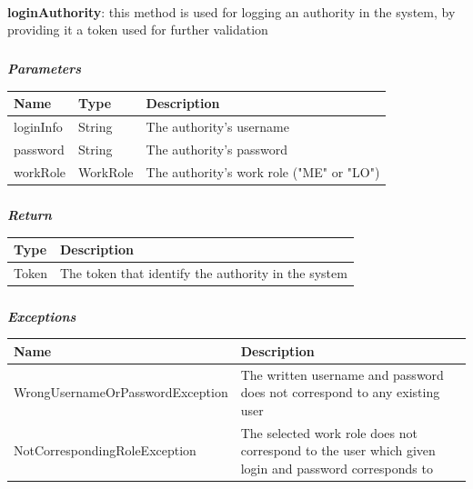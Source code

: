 					\paragraph{}
							\textbf{loginAuthority}: this method is used for logging an authority in the system, by providing it a token used for further validation
							\subparagraph{}
							\vspace{-3mm}
							\textcolor{myBlue}{\textit{\textbf{Parameters}}}
							\vspace{-2mm}
								\begin{table}[!h]
									\begin{tabular}{L{0.15\textwidth}L{0.15\textwidth}L{0.53\textwidth}}
										\toprule
										\textbf{Name} & \textbf{Type} & \textbf{Description} \\
										\midrule
								  		loginInfo & String & The authority's username \\
								  		password & String & The authority's password \\
								  		workRole & WorkRole & The authority's work role ("ME" or "LO") \\
								 		\bottomrule
									\end{tabular}
								\end{table}
							\subparagraph{}
							\vspace{-6mm}
								\textcolor{myGreen}{\textit{\textbf{Return}}}
								\vspace{-2mm}
									\begin{table}[!h]
									\begin{tabular}{L{0.15\textwidth}L{0.77\textwidth}}
										\toprule
										\textbf{Type} & \textbf{Description} \\
										\midrule
								  		Token & The token that identify the authority in the system \\
								 		\bottomrule
									\end{tabular}
								\end{table}
							\subparagraph{}
							\vspace{-6mm}
								\textcolor{myRed}{\textit{\textbf{Exceptions}}}
								\vspace{-2mm}
									\begin{table}[!h]
									\begin{tabular}{L{0.5\textwidth}L{0.42\textwidth}}
										\toprule
										\textbf{Name} & \textbf{Description} \\
										\midrule
								  	WrongUsernameOrPasswordException & The written username and password does not correspond to any existing user \\
								  	NotCorrespondingRoleException & The selected work role does not correspond to the user which given login and password corresponds to \\
								 		\bottomrule
									\end{tabular}
								\end{table}

